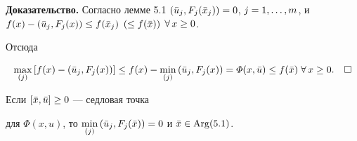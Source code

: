 {\bf Доказательство.} Согласно лемме 5.1\; $(\Bar{u}_j, F_j


(\Bar{x}_j)) = 0$, $j=\ij{m}$, и $f(x) - (\Bar{u}_j, F_j (x))


\le f(\Bar{x}_j)$ $(\le f(\Bar{x}))$ $\fo\, x \ge 0$.


Отсюда


$$


\max_{(j)}\, [f(x) -(\Bar{u}_j, F_j (x))] \le f(x)


-\min_{(j)}\, (\Bar{u}_j, F_j(x)) = \varPhi (x, \Bar{u}) \le


f(\Bar{x})\; \fo\, x \ge 0.\quad\square


$$





\begin{lems}


Если $[ \Bar{x}, \Bar{u} ] \ge 0$ --- седловая точка


для $\varPhi (x, u)$, то $\min\limits_{(j)}\, (\Bar{u}_j,


F_j(\Bar{x})) =0$ и $\Bar{x} \in \Arg(5.1)$.


\end{lems}





